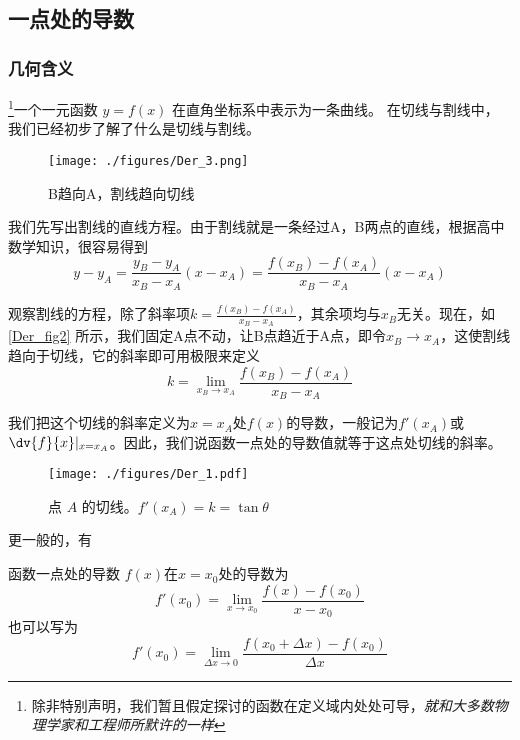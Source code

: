 

\subsection{一点处的导数}
\subsubsection{几何含义}
\footnote{除非特别声明，我们暂且假定探讨的函数在定义域内处处可导，\textsl{就和大多数物理学家和工程师所默许的一样}}一个一元函数 $y = f(x)$ 在直角坐标系中表示为一条曲线。 在切线与割线中，我们已经初步了解了什么是切线与割线。

\begin{figure}[ht]
\centering
\texttt{[image: ./figures/Der\_3.png]}
\caption{B趋向A，割线趋向切线} \label{Der_fig2}
\end{figure}

我们先写出割线的直线方程。由于割线就是一条经过A，B两点的直线，根据高中数学知识，很容易得到
\begin{equation}
y-y_A=\frac{y_B-y_A}{x_B-x_A}(x-x_A)=\frac{f(x_B)-f(x_A)}{x_B-x_A}(x-x_A)
\end{equation}

观察割线的方程，除了斜率项$k=\frac{f(x_B)-f(x_A)}{x_B-x_A}$，其余项均与$x_B$无关。现在，如\autoref{Der_fig2} 所示，我们固定A点不动，让B点趋近于A点，即令$x_B\rightarrow x_A$，这使割线趋向于切线，它的斜率即可用极限来定义
\begin{equation}
k=\lim_{x_B\to x_A}\frac{f(x_B)-f(x_A)}{x_B-x_A}
\end{equation}

我们把这个切线的斜率定义为$x=x_A$处$f(x)$的导数，一般记为$f'(x_A)$或$\dv{f}{x}|_{x=x_A}$。因此，我们说函数一点处的导数值就等于这点处切线的斜率。

\begin{figure}[ht]
\centering
\texttt{[image: ./figures/Der\_1.pdf]}
\caption{点 $A$ 的切线。$f'(x_A)=k=\tan \theta$}
\end{figure}

更一般的，有
\begin{definition}{函数一点处的导数}
$f(x)$在$x=x_0$处的导数为
\begin{equation}
f'(x_0)=\lim_{x\to x_0}\frac{f(x)-f(x_0)}{x-x_0}
\end{equation}
也可以写为
\begin{equation}\label{Der_eq2}
f'(x_0)=\lim_{\Delta x\to0}\frac{f(x_0+\Delta x)-f(x_0)}{\Delta x}
\end{equation}
\end{definition}

